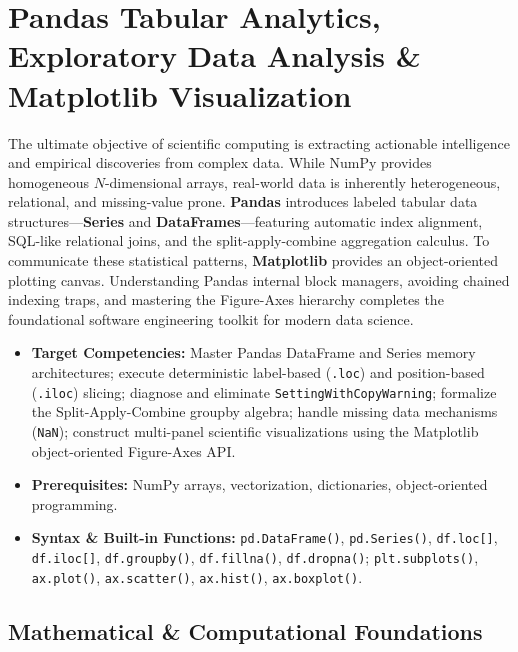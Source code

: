 \chapter{Pandas Tabular Analytics, Exploratory Data Analysis \& Matplotlib Visualization}

The ultimate objective of scientific computing is extracting actionable intelligence and empirical discoveries from complex data. While NumPy provides homogeneous $N$-dimensional arrays, real-world data is inherently heterogeneous, relational, and missing-value prone. \textbf{Pandas} introduces labeled tabular data structures---\textbf{Series} and \textbf{DataFrames}---featuring automatic index alignment, SQL-like relational joins, and the split-apply-combine aggregation calculus. To communicate these statistical patterns, \textbf{Matplotlib} provides an object-oriented plotting canvas. Understanding Pandas internal block managers, avoiding chained indexing traps, and mastering the Figure-Axes hierarchy completes the foundational software engineering toolkit for modern data science.

\vspace{0.5cm}
\begin{tcolorbox}[colback=primarylight, colframe=primarydark, title={\textbf{Executive Roadmap \& Learning Objectives}}]
\begin{itemize}
    \item \textbf{Target Competencies:} Master Pandas DataFrame and Series memory architectures; execute deterministic label-based (\texttt{.loc}) and position-based (\texttt{.iloc}) slicing; diagnose and eliminate \texttt{SettingWithCopyWarning}; formalize the Split-Apply-Combine groupby algebra; handle missing data mechanisms (\texttt{NaN}); construct multi-panel scientific visualizations using the Matplotlib object-oriented Figure-Axes API.
    \item \textbf{Prerequisites:} NumPy arrays, vectorization, dictionaries, object-oriented programming.
    \item \textbf{Syntax \& Built-in Functions:} \texttt{pd.DataFrame()}, \texttt{pd.Series()}, \texttt{df.loc[]}, \texttt{df.iloc[]}, \texttt{df.groupby()}, \texttt{df.fillna()}, \texttt{df.dropna()}; \texttt{plt.subplots()}, \texttt{ax.plot()}, \texttt{ax.scatter()}, \texttt{ax.hist()}, \texttt{ax.boxplot()}.
\end{itemize}
\end{tcolorbox}

\section{Mathematical \& Computational Foundations}

